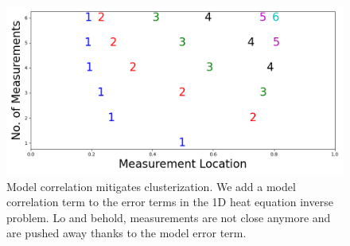 \begin{figure}
    \centering
    \includegraphics[height=0.5\textwidth]{figs/dst_modelError4.png}
    \caption{Model correlation mitigates clusterization. We add a
      model correlation term to the error terms in the 1D heat
      equation inverse problem. Lo and behold, measurements are not
      close anymore and are pushed away thanks to the model error
      term.}
  \label{fig:corr_errors}
\end{figure}




